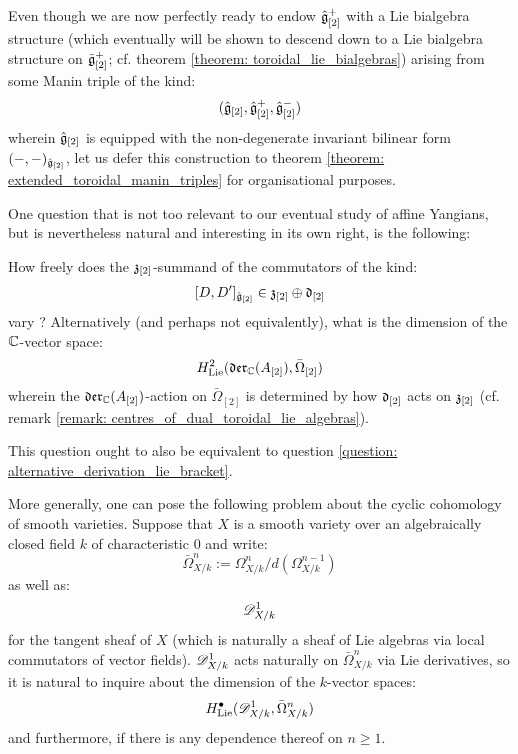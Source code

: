         Even though we are now perfectly ready to endow $\hat{\mathfrak{g}}_{[2]}^+$ with a Lie bialgebra structure (which eventually will be shown to descend down to a Lie bialgebra structure on $\tilde{\mathfrak{g}}_{[2]}^+$; cf. theorem \ref{theorem: toroidal_lie_bialgebras}) arising from some Manin triple of the kind:
            $$(\hat{\mathfrak{g}}_{[2]}, \hat{\mathfrak{g}}_{[2]}^+, \hat{\mathfrak{g}}_{[2]}^-)$$
        wherein $\hat{\mathfrak{g}}_{[2]}$ is equipped with the non-degenerate invariant bilinear form $(-, -)_{\hat{\mathfrak{g}}_{[2]}}$, let us defer this construction to theorem \ref{theorem: extended_toroidal_manin_triples} for organisational purposes.

        One question that is not too relevant to our eventual study of affine Yangians, but is nevertheless natural and interesting in its own right, is the following:
        \begin{question} \label{question: uniqueness_of_extended_toroidal_lie_algebras}
            How freely does the $\mathfrak{z}_{[2]}$-summand of the commutators of the kind:
                $$[D, D']_{ \hat{\mathfrak{g}}_{[2]} } \in \mathfrak{z}_{[2]} \oplus \mathfrak{d}_{[2]}$$
            vary ? Alternatively (and perhaps not equivalently), what is the dimension of the $\mathbb{C}$-vector space:
                $$H^2_{\mathrm{Lie}}( \mathfrak{der}_{\mathbb{C}}(A_{[2]}), \bar{\Omega}_{[2]} )$$
            wherein the $\mathfrak{der}_{\mathbb{C}}(A_{[2]})$-action on $\bar{\Omega}_{[2]}$ is determined by how $\mathfrak{d}_{[2]}$ acts on $\mathfrak{z}_{[2]}$ (cf. remark \ref{remark: centres_of_dual_toroidal_lie_algebras}).

            This question ought to also be equivalent to question \ref{question: alternative_derivation_lie_bracket}. 
        \end{question}
        \begin{question}
            More generally, one can pose the following problem about the cyclic cohomology of smooth varieties. Suppose that $X$ is a smooth variety over an algebraically closed field $k$ of characteristic $0$ and write:
                $$\bar{\Omega}_{X/k}^n := \Omega_{X/k}^n/d( \Omega_{X/k}^{n - 1} )$$
            as well as:
                $$\mathscr{D}_{X/k}^1$$
            for the tangent sheaf of $X$ (which is naturally a sheaf of Lie algebras via local commutators of vector fields). $\mathscr{D}_{X/k}^1$ acts naturally on $\bar{\Omega}_{X/k}^n$ via Lie derivatives, so it is natural to inquire about the dimension of the $k$-vector spaces:
                $$H^{\bullet}_{\mathrm{Lie}}( \mathscr{D}_{X/k}^1, \bar{\Omega}_{X/k}^n )$$
            and furthermore, if there is any dependence thereof on $n \geq 1$.  
        \end{question}

